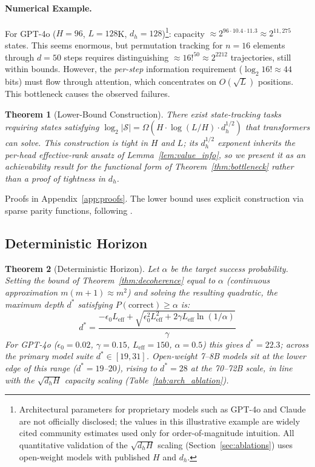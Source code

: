 \documentclass{article}
\theoremstyle{plain}
\newtheorem{theorem}{Theorem}[section]
\theoremstyle{definition}
\theoremstyle{remark}
\newcommand{\Leff}{L_{\mathrm{eff}}}
\begin{document}
\paragraph{Numerical Example.} For GPT-4o ($H=96$, $L=128$K, $d_h=128$)\footnote{Architectural parameters for proprietary models such as GPT-4o and Claude are not officially disclosed; the values in this illustrative example are widely cited community estimates used only for order-of-magnitude intuition. All quantitative validation of the $\sqrt{d_h H}$ scaling (Section~\ref{sec:ablations}) uses open-weight models with published $H$ and $d_h$.}: capacity $\approx 2^{96 \cdot 10.4 \cdot 11.3} \approx 2^{11,275}$ states. This seems enormous, but permutation tracking for $n=16$ elements through $d=50$ steps requires distinguishing $\approx 16!^{50} \approx 2^{2212}$ trajectories, still within bounds. However, the \emph{per-step} information requirement ($\log_2 16! \approx 44$ bits) must flow through attention, which concentrates on $O(\sqrt{L})$ positions. This bottleneck causes the observed failures.

\begin{theorem}[Lower-Bound Construction]
\label{thm:lower}
There exist state-tracking tasks requiring states satisfying $\log_2|\mathcal{S}| = \Omega(H \cdot \log(L/H) \cdot d_h^{1/2})$ that transformers can solve. This construction is tight in $H$ and $L$; its $d_h^{1/2}$ exponent inherits the per-head effective-rank ansatz of Lemma~\ref{lem:value_info}, so we present it as an achievability result for the functional form of Theorem~\ref{thm:bottleneck} rather than a proof of tightness in $d_h$.
\end{theorem}

Proofs in Appendix~\ref{app:proofs}. The lower bound uses explicit construction via sparse parity functions, following \citet{sanford2024representational}.

\subsection{Deterministic Horizon}

\begin{theorem}[Deterministic Horizon]
\label{thm:horizon}
Let $\alpha$ be the target success probability. Setting the bound of Theorem~\ref{thm:decoherence} equal to $\alpha$ (continuous approximation $m(m+1) \approx m^2$) and solving the resulting quadratic, the maximum depth $d^*$ satisfying $P(\text{correct}) \geq \alpha$ is:
\begin{equation}
d^* = \frac{-\epsilon_0 \Leff + \sqrt{\epsilon_0^2 \Leff^2 + 2\gamma \Leff \ln(1/\alpha)}}{\gamma}
\end{equation}
For GPT-4o ($\epsilon_0 = 0.02$, $\gamma = 0.15$, $\Leff = 150$, $\alpha = 0.5$) this gives $d^* = 22.3$; across the primary model suite $d^* \in [19, 31]$. Open-weight 7--8B models sit at the lower edge of this range ($d^* = 19$--$20$), rising to $d^* = 28$ at the 70--72B scale, in line with the $\sqrt{d_h H}$ capacity scaling (Table~\ref{tab:arch_ablation}).
\end{theorem}
\end{document}
